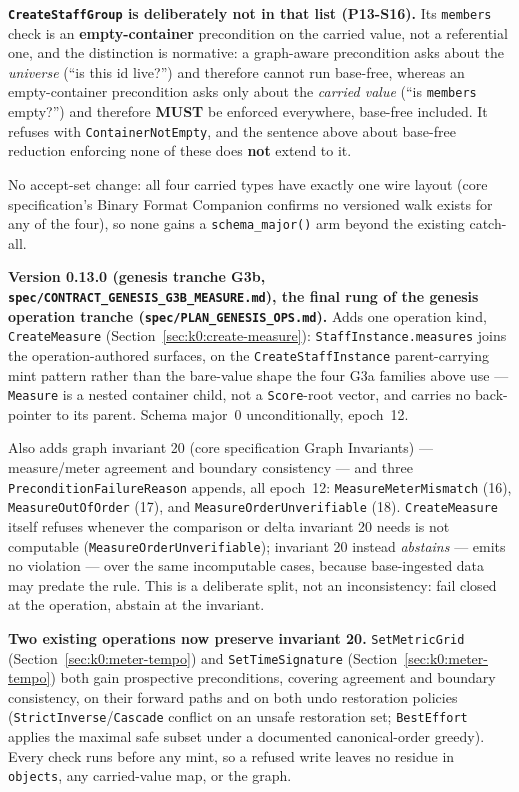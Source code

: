 \documentclass[11pt,letterpaper]{report}
\newcommand{\sectionsc}[1]{{\addfontfeatures{Letters=SmallCaps}#1}}
\newcommand{\MUST}{\textbf{MUST}}
\begin{document}
\textbf{\texttt{CreateStaffGroup} is deliberately not in that list (P13-S16).}
Its \texttt{members} check is an \textbf{empty-container} precondition on the
carried value, not a referential one, and the distinction is normative: a
graph-aware precondition asks about the \emph{universe} (``is this id live?'')
and therefore cannot run base-free, whereas an empty-container precondition asks
only about the \emph{carried value} (``is \texttt{members} empty?'') and
therefore \MUST{} be enforced everywhere, base-free included. It refuses with
\texttt{ContainerNotEmpty}, and the sentence above about base-free reduction
enforcing none of these does \textbf{not} extend to it.

No accept-set change: all four carried types have exactly one wire layout
(core specification's \sectionsc{Binary Format Companion} confirms no
versioned walk exists for any of the four), so none gains a
\texttt{schema\_major()} arm beyond the existing catch-all.

\medskip

\noindent\textbf{Version 0.13.0 (genesis tranche G3b,
\texttt{spec/CONTRACT\_GENESIS\_G3B\_MEASURE.md}), the final rung of the
genesis operation tranche (\texttt{spec/PLAN\_GENESIS\_OPS.md}).} Adds one
operation kind, \texttt{CreateMeasure} (Section~\ref{sec:k0:create-measure}):
\texttt{StaffInstance.measures} joins the operation-authored surfaces, on the
\texttt{CreateStaffInstance} parent-carrying mint pattern rather than the
bare-value shape the four G3a families above use --- \texttt{Measure} is a
nested container child, not a \texttt{Score}-root vector, and carries no
back-pointer to its parent. Schema major~0 unconditionally, epoch~12.

Also adds graph invariant 20 (core specification \sectionsc{Graph
Invariants}) --- measure/meter agreement and boundary consistency --- and
three \texttt{PreconditionFailureReason} appends, all epoch~12:
\texttt{MeasureMeterMismatch} (16), \texttt{MeasureOutOfOrder} (17), and
\texttt{MeasureOrderUnverifiable} (18). \texttt{CreateMeasure} itself refuses
whenever the comparison or delta invariant 20 needs is not computable
(\texttt{MeasureOrderUnverifiable}); invariant 20 instead \emph{abstains} ---
emits no violation --- over the same incomputable cases, because base-ingested
data may predate the rule. This is a deliberate split, not an inconsistency:
fail closed at the operation, abstain at the invariant.

\textbf{Two existing operations now preserve invariant 20.} \texttt{SetMetricGrid}
(Section~\ref{sec:k0:meter-tempo}) and \texttt{SetTimeSignature}
(Section~\ref{sec:k0:meter-tempo}) both gain prospective preconditions,
covering agreement and boundary consistency, on their forward paths and on
both undo restoration policies (\texttt{StrictInverse}/\texttt{Cascade}
conflict on an unsafe restoration set; \texttt{BestEffort} applies the
maximal safe subset under a documented canonical-order greedy). Every check
runs before any mint, so a refused write leaves no residue in \texttt{objects},
any carried-value map, or the graph.
\end{document}
